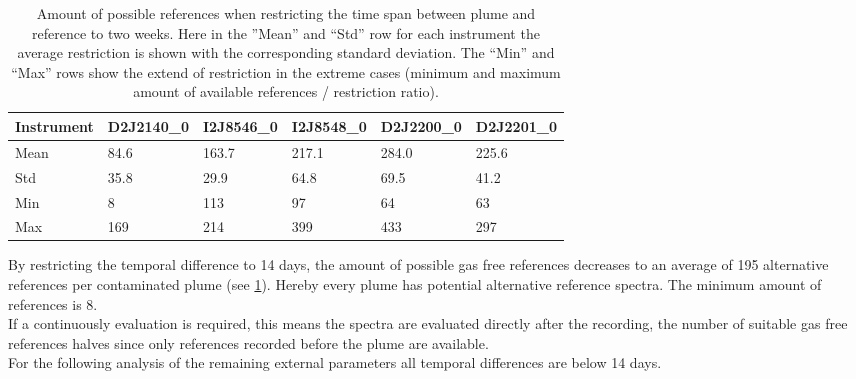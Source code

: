 \begin{table}[h]
	\centering
	\begin{tabular}{|p{1.8cm}|p{2.15cm}|p{2.15cm}|p{2.15cm}|p{2.15cm}|p{2.15cm}|}
		Instrument	&D2J2140\_0&I2J8546\_0& I2J8548\_0&D2J2200\_0&D2J2201\_0\\
		\toprule
		Mean&84.6 &163.7 &217.1&284.0 &225.6 \\
		\midrule
		Std&
		35.8&%
		29.9&%
		64.8&%
		69.5&%
		41.2\\%
		\midrule
		Min&
		8 &%
		113&%
		97 &%
		64&%
		63\\%
		\midrule
		Max&
		169&%
		214&%
		399&%
		433&%
		297\\%
		\bottomrule
	\end{tabular}
	\caption{Amount of possible references when restricting the time span between plume and reference to two weeks. Here in the ”Mean” and “Std” row for each  instrument the average restriction is shown with the corresponding standard deviation. The “Min” and “Max” rows show the extend of restriction in the extreme cases (minimum and maximum amount of available references / restriction ratio).}
	\label{Tab:refstime}
\end{table}	
By restricting the temporal difference to 14 days, the amount of possible gas free references decreases to an average of 195 alternative references per contaminated plume (see \cref{Tab:refstime}). Hereby every plume has potential alternative reference spectra. The minimum amount of references is 8.\\
If a continuously evaluation is required, this means the spectra are evaluated directly after the recording, the number of suitable gas free references halves since only references recorded before the plume are available.\\
For the following analysis of the remaining external parameters all temporal differences are below 14 days.
